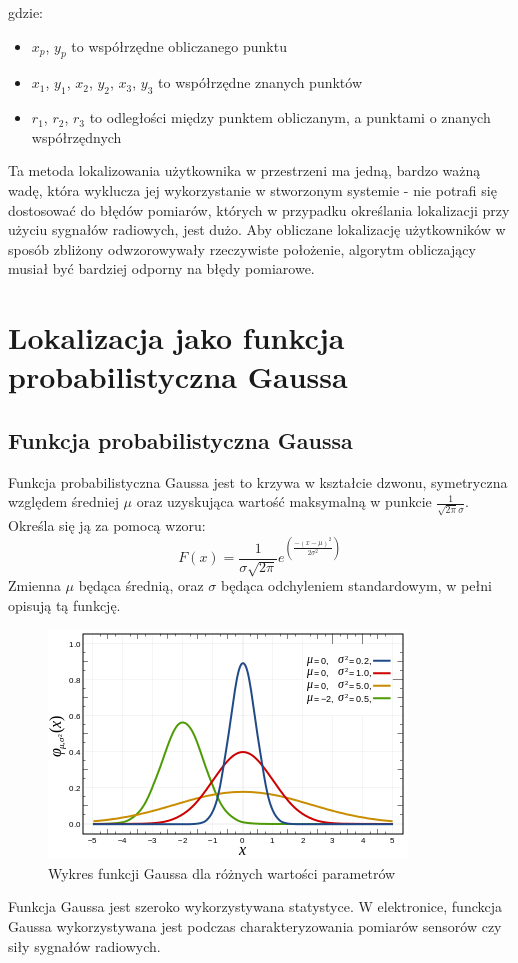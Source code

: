 gdzie:
\begin{itemize}
	\item $x_p$, $y_p$ to współrzędne obliczanego punktu
	\item $x_1$, $y_1$, $x_2$, $y_2$, $x_3$, $y_3$ to współrzędne znanych punktów
	\item $r_1$, $r_2$, $r_3$ to odległości między punktem obliczanym, a punktami o znanych współrzędnych
\end{itemize}
Ta metoda lokalizowania użytkownika w przestrzeni ma jedną, bardzo ważną wadę, która wyklucza jej wykorzystanie w stworzonym systemie - nie potrafi się dostosować do błędów pomiarów, których w przypadku określania lokalizacji przy użyciu sygnałów radiowych, jest dużo. Aby obliczane lokalizację użytkowników w sposób zbliżony odwzorowywały rzeczywiste położenie, algorytm obliczający musiał być bardziej odporny na błędy pomiarowe.
\section{Lokalizacja jako funkcja probabilistyczna Gaussa}
\subsection{Funkcja probabilistyczna Gaussa}
Funkcja probabilistyczna Gaussa jest to krzywa w kształcie dzwonu, symetryczna względem średniej $\mu$ oraz uzyskująca wartość maksymalną w punkcie $\frac{1}{\sqrt{2\pi}\sigma}$.
Określa się ją za pomocą wzoru:
\begin{equation}
F(x) = \frac{1}{\sigma\sqrt{2\pi}}e^{\left(\frac{-(x-\mu)^2}{2\sigma^2}\right)}
\end{equation}
Zmienna $\mu$ będąca średnią, oraz $\sigma$ będąca odchyleniem standardowym, w pełni opisują tą funkcję.
\begin{figure}[H]			
	\centering
	\caption{Wykres funkcji Gaussa dla różnych wartości parametrów}
	\includegraphics{funkcja_Gaussa}
\end{figure}
Funkcja Gaussa jest szeroko wykorzystywana statystyce. W elektronice, funckcja Gaussa wykorzystywana jest podczas charakteryzowania pomiarów sensorów czy siły sygnałów radiowych.
